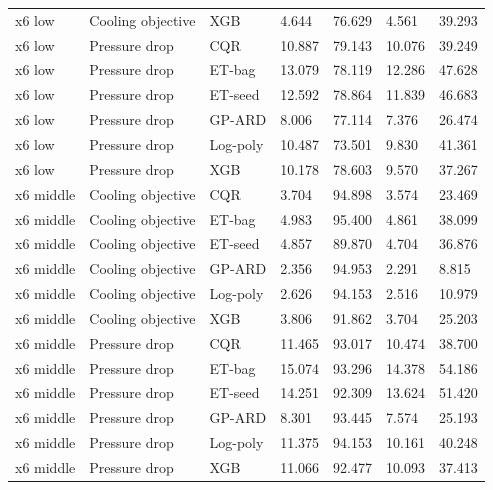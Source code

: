 \begin{longtable}{lllllll}
x6 low & Cooling objective & XGB & 4.644 & 76.629 & 4.561 & 39.293\\
x6 low & Pressure drop & CQR & 10.887 & 79.143 & 10.076 & 39.249\\
x6 low & Pressure drop & ET-bag & 13.079 & 78.119 & 12.286 & 47.628\\
x6 low & Pressure drop & ET-seed & 12.592 & 78.864 & 11.839 & 46.683\\
x6 low & Pressure drop & GP-ARD & 8.006 & 77.114 & 7.376 & 26.474\\
x6 low & Pressure drop & Log-poly & 10.487 & 73.501 & 9.830 & 41.361\\
x6 low & Pressure drop & XGB & 10.178 & 78.603 & 9.570 & 37.267\\
x6 middle & Cooling objective & CQR & 3.704 & 94.898 & 3.574 & 23.469\\
x6 middle & Cooling objective & ET-bag & 4.983 & 95.400 & 4.861 & 38.099\\
x6 middle & Cooling objective & ET-seed & 4.857 & 89.870 & 4.704 & 36.876\\
x6 middle & Cooling objective & GP-ARD & 2.356 & 94.953 & 2.291 & 8.815\\
x6 middle & Cooling objective & Log-poly & 2.626 & 94.153 & 2.516 & 10.979\\
x6 middle & Cooling objective & XGB & 3.806 & 91.862 & 3.704 & 25.203\\
x6 middle & Pressure drop & CQR & 11.465 & 93.017 & 10.474 & 38.700\\
x6 middle & Pressure drop & ET-bag & 15.074 & 93.296 & 14.378 & 54.186\\
x6 middle & Pressure drop & ET-seed & 14.251 & 92.309 & 13.624 & 51.420\\
x6 middle & Pressure drop & GP-ARD & 8.301 & 93.445 & 7.574 & 25.193\\
x6 middle & Pressure drop & Log-poly & 11.375 & 94.153 & 10.161 & 40.248\\
x6 middle & Pressure drop & XGB & 11.066 & 92.477 & 10.093 & 37.413\\
\bottomrule\end{longtable}\endgroup
